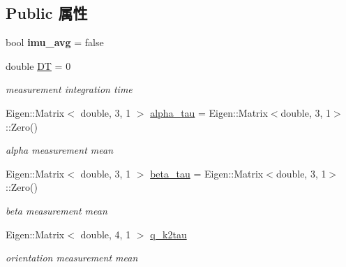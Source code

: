 \subsection*{Public 属性}
\begin{DoxyCompactItemize}
\item 
\mbox{\label{classov__core_1_1CpiBase_a44b409fc4abd74901b30813a0aeef868}} 
bool {\bfseries imu\+\_\+avg} = false
\item 
\mbox{\label{classov__core_1_1CpiBase_a0c28fb509ed55ef7ba4957735490a0e7}} 
double \hyperlink{classov__core_1_1CpiBase_a0c28fb509ed55ef7ba4957735490a0e7}{DT} = 0
\begin{DoxyCompactList}\small\item\em measurement integration time \end{DoxyCompactList}\item 
\mbox{\label{classov__core_1_1CpiBase_adb27448c25850a08a47d02184cfee45e}} 
Eigen\+::\+Matrix$<$ double, 3, 1 $>$ \hyperlink{classov__core_1_1CpiBase_adb27448c25850a08a47d02184cfee45e}{alpha\+\_\+tau} = Eigen\+::\+Matrix$<$double, 3, 1$>$\+::Zero()
\begin{DoxyCompactList}\small\item\em alpha measurement mean \end{DoxyCompactList}\item 
\mbox{\label{classov__core_1_1CpiBase_a948805010b85aab837fd7414ca8dc8c5}} 
Eigen\+::\+Matrix$<$ double, 3, 1 $>$ \hyperlink{classov__core_1_1CpiBase_a948805010b85aab837fd7414ca8dc8c5}{beta\+\_\+tau} = Eigen\+::\+Matrix$<$double, 3, 1$>$\+::Zero()
\begin{DoxyCompactList}\small\item\em beta measurement mean \end{DoxyCompactList}\item 
\mbox{\label{classov__core_1_1CpiBase_a9fdb4dd0a3c7c68f39464b26a71ab1cf}} 
Eigen\+::\+Matrix$<$ double, 4, 1 $>$ \hyperlink{classov__core_1_1CpiBase_a9fdb4dd0a3c7c68f39464b26a71ab1cf}{q\+\_\+k2tau}
\begin{DoxyCompactList}\small\item\em orientation measurement mean \end{DoxyCompactList}\item 

\end{DoxyCompactItemize}
